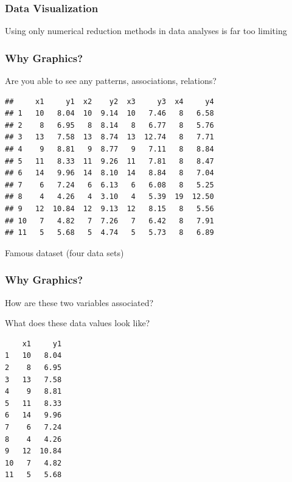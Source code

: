 \documentclass[12pt]{beamer}\usepackage[]{graphicx}\usepackage[]{color}
\makeatletter
\newenvironment{kframe}{%
 \def\at@end@of@kframe{}%
 \ifinner\ifhmode%
  \def\at@end@of@kframe{\end{minipage}}%
  \begin{minipage}{\columnwidth}%
 \fi\fi%
 \def\FrameCommand##1{\hskip\@totalleftmargin \hskip-\fboxsep
 \colorbox{shadecolor}{##1}\hskip-\fboxsep
     \hskip-\linewidth \hskip-\@totalleftmargin \hskip\columnwidth}%
 \MakeFramed {\advance\hsize-\width
   \@totalleftmargin\z@ \linewidth\hsize
   \@setminipage}}%
 {\par\unskip\endMakeFramed%
 \at@end@of@kframe}
\newenvironment{knitrout}{}{} %
\makeatother
\begin{document}
\begin{frame}
\frametitle{Data Visualization}

Using only numerical reduction methods in data analyses is far too limiting

\end{frame}


\begin{frame}[fragile]
\frametitle{Why Graphics?}

Are you able to see any patterns, associations, relations?
\begin{knitrout}\scriptsize
{}\color{fgcolor}\begin{kframe}
\begin{verbatim}
##     x1     y1  x2    y2  x3     y3  x4     y4
## 1   10   8.04  10  9.14  10   7.46   8   6.58
## 2    8   6.95   8  8.14   8   6.77   8   5.76
## 3   13   7.58  13  8.74  13  12.74   8   7.71
## 4    9   8.81   9  8.77   9   7.11   8   8.84
## 5   11   8.33  11  9.26  11   7.81   8   8.47
## 6   14   9.96  14  8.10  14   8.84   8   7.04
## 7    6   7.24   6  6.13   6   6.08   8   5.25
## 8    4   4.26   4  3.10   4   5.39  19  12.50
## 9   12  10.84  12  9.13  12   8.15   8   5.56
## 10   7   4.82   7  7.26   7   6.42   8   7.91
## 11   5   5.68   5  4.74   5   5.73   8   6.89
\end{verbatim}
\end{kframe}
\end{knitrout}

{\small Famous dataset  (four data sets)}
\end{frame}


\begin{frame}[fragile]
\frametitle{Why Graphics?}

How are these two variables associated?

\bigskip
What does these data values look like?
\begin{knitrout}\scriptsize
{}\color{fgcolor}\begin{kframe}
\begin{verbatim}
    x1     y1
1   10   8.04
2    8   6.95
3   13   7.58
4    9   8.81
5   11   8.33
6   14   9.96
7    6   7.24
8    4   4.26
9   12  10.84
10   7   4.82
11   5   5.68
\end{verbatim}
\end{kframe}
\end{knitrout}

\end{frame}
\end{document}
